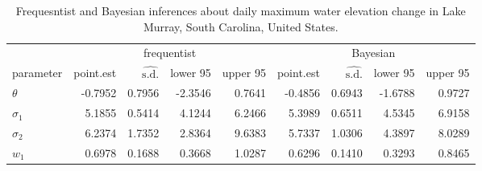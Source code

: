 \begin{table}

\caption{\label{tab:E2tab}Frequesntist and Bayesian inferences about daily maximum water elevation change in Lake Murray, South Carolina, United States.}
\centering
\begin{tabular}[t]{lrrrrrrrr}
\toprule
\multicolumn{1}{c}{ } & \multicolumn{4}{c}{frequentist} & \multicolumn{4}{c}{Bayesian} \\
\cmidrule(l{3pt}r{3pt}){2-5} \cmidrule(l{3pt}r{3pt}){6-9}
parameter & point.est & $\widehat{\text{s.d.}}$ & lower 95 & upper 95 & point.est & $\widehat{\text{s.d.}}$ & lower 95 & upper 95\\
\midrule
$\theta$ & -0.7952 & 0.7956 & -2.3546 & 0.7641 & -0.4856 & 0.6943 & -1.6788 & 0.9727\\
$\sigma_1$ & 5.1855 & 0.5414 & 4.1244 & 6.2466 & 5.3989 & 0.6511 & 4.5345 & 6.9158\\
$\sigma_2$ & 6.2374 & 1.7352 & 2.8364 & 9.6383 & 5.7337 & 1.0306 & 4.3897 & 8.0289\\
$w_1$ & 0.6978 & 0.1688 & 0.3668 & 1.0287 & 0.6296 & 0.1410 & 0.3293 & 0.8465\\
\bottomrule
\end{tabular}
\end{table}

